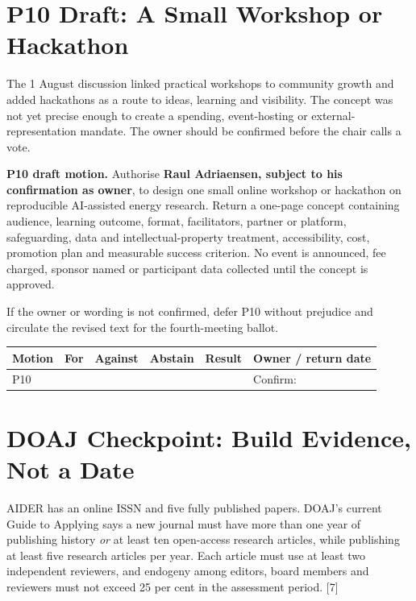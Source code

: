 \documentclass[11pt]{article}
\newcommand{\src}[1]{{\footnotesize\color{ink3}[#1]}}
\begin{document}
\section{P10 Draft: A Small Workshop or Hackathon}

The 1 August discussion linked practical workshops to community growth and added hackathons as a route to ideas, learning and visibility. The concept was not yet precise enough to create a spending, event-hosting or external-representation mandate. The owner should be confirmed before the chair calls a vote.

\begin{takeaway}
\textbf{P10 draft motion.} Authorise \textbf{Raul Adriaensen, subject to his confirmation as owner}, to design one small online workshop or hackathon on reproducible AI-assisted energy research. Return a one-page concept containing audience, learning outcome, format, facilitators, partner or platform, safeguarding, data and intellectual-property treatment, accessibility, cost, promotion plan and measurable success criterion. No event is announced, fee charged, sponsor named or participant data collected until the concept is approved.
\end{takeaway}

If the owner or wording is not confirmed, defer P10 without prejudice and circulate the revised text for the fourth-meeting ballot.

\begin{center}\small\sffamily
\begin{tabular}{@{}p{1.2cm}p{2cm}p{2cm}p{2cm}p{2cm}p{3.2cm}@{}}
\toprule
\textbf{Motion} & \textbf{For} & \textbf{Against} & \textbf{Abstain} & \textbf{Result} & \textbf{Owner / return date} \\
\midrule
P10 & & & & & Confirm: \\[9pt]
\bottomrule
\end{tabular}
\end{center}

\section{DOAJ Checkpoint: Build Evidence, Not a Date}

AIDER has an online ISSN and five fully published papers. DOAJ's current Guide to Applying says a new journal must have more than one year of publishing history \emph{or} at least ten open-access research articles, while publishing at least five research articles per year. Each article must use at least two independent reviewers, and endogeny among editors, board members and reviewers must not exceed 25 per cent in the assessment period. \src{7}
\end{document}

